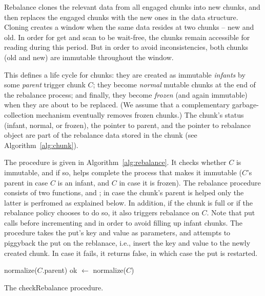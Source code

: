 Rebalance clones the relevant data from all engaged chunks  into new chunks, and then
replaces the engaged chunks with the new ones in the data structure.
Cloning creates a window when the same data resides at two chunks -- new and old.
In order for get and scan to be wait-free, the chunks remain accessible for reading during this period.
But in order to avoid inconsistencies, both chunks (old and new) are immutable throughout the window.

This defines a life cycle for chunks: they are created as immutable \emph{infants} by some \emph{parent} trigger chunk $C$;
they become \emph{normal} mutable chunks at the end of the rebalance process; and finally, they become \emph{frozen}
(and again immutable) when they are about to be replaced.
(We assume that a complementary garbage-collection mechanism eventually removes frozen chunks.)
The chunk's status (infant, normal, or frozen), the pointer to parent, and the pointer to rebalance object are part of the rebalance data
stored in the chunk (see Algorithm~\ref{alg:chunk}).


The  procedure is given in Algorithm~\ref{alg:rebalance}. 
It checks whether $C$ is immutable, and if so, helps complete the process that makes it immutable
($C$'s parent in case $C$ is an infant, and $C$ in case it is frozen).
The rebalance procedure consists of two functions,  and ; in case
the chunk's parent is helped only the latter is perfromed as explained below.
In addition, if the chunk is full or if the rebalance policy chooses to do so, it also triggers rebalance on $C$.
Note that put calls  before incrementing  and  in order to avoid filling up infant chunks.
The  procedure takes the put's key and value as parameters, and attempts to piggyback the put on the reblanace, i.e., insert the key and value to the newly created chunk. In case it fails, it returns false, in which case the put is restarted. 

\begin{algorithm}[tb]
\codesize
	\begin{algorithmic}[1]{}
			\State normalize($C$.parent)
			\State {} 
		\EndIf
			\State ok $\leftarrow$ 
			\State normalize($C$)
			  \EndIf 
		\EndIf
		\EndProcedure
	\end{algorithmic}
\caption{The checkRebalance procedure.}
\label{alg:check-rebalance}
\end{algorithm}	


